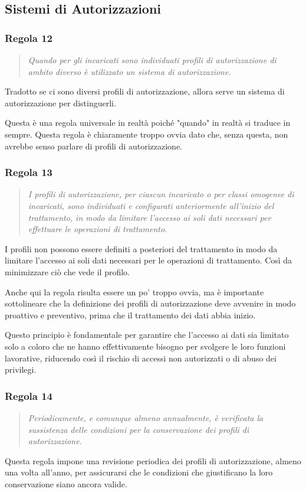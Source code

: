 \subsection{Sistemi di Autorizzazioni}
\subsubsection*{Regola 12}
\begin{quote}
    \item \textit{Quando per gli incaricati sono individuati profili di autorizzazione di ambito diverso è utilizzato un sistema di autorizzazione.}
\end{quote}

Tradotto se ci sono diversi profili di autorizzazione, allora serve un sistema di autorizzazione per distinguerli. 

Questa è una regola universale in realtà poiché "quando" in realtà si traduce in sempre. Questa regola è chiaramente troppo ovvia dato che, senza questa, non avrebbe senso parlare di profili di autorizzazione. 

\subsubsection*{Regola 13}
\begin{quote}
    \textit{I profili di autorizzazione, per ciascun incaricato o per classi omogenee di incaricati, sono individuati e configurati anteriormente all'inizio del trattamento, in modo da limitare l'accesso ai soli dati necessari per effettuare le operazioni di trattamento.}
\end{quote}
I profili non possono essere definiti a posteriori del trattamento in modo da limitare l'accesso ai soli dati necessari per le operazioni di trattamento. Così da minimizzare ciò che vede il profilo.

Anche qui la regola risulta essere un po' troppo ovvia, ma è importante sottolineare che la definizione dei profili di autorizzazione deve avvenire in modo proattivo e preventivo, prima che il trattamento dei dati abbia inizio. 

Questo principio è fondamentale per garantire che l'accesso ai dati sia limitato solo a coloro che ne hanno effettivamente bisogno per svolgere le loro funzioni lavorative, riducendo così il rischio di accessi non autorizzati o di abuso dei privilegi.

\subsubsection*{Regola 14}
\begin{quote}
    \textit{ Periodicamente, e comunque almeno annualmente, è verificata la sussistenza delle condizioni per la conservazione dei profili di autorizzazione.}
\end{quote}
Questa regola impone una revisione periodica dei profili di autorizzazione, almeno una volta all'anno, per assicurarsi che le condizioni che giustificano la loro conservazione siano ancora valide. 

